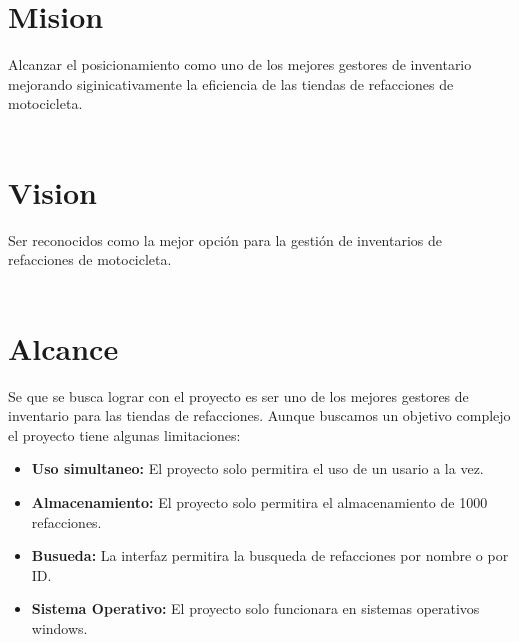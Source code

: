 \section*{Mision}

    Alcanzar el posicionamiento como uno de los mejores gestores de inventario
    mejorando siginicativamente la eficiencia de las tiendas de refacciones de motocicleta.
\\
\\
\section*{Vision}

    Ser reconocidos como la mejor opción para la gestión de inventarios de refacciones de motocicleta.
\\ \\
\section*{Alcance} Se que se busca lograr con el proyecto es 
ser uno de los mejores gestores de inventario para las tiendas de refacciones.
\newline
Aunque buscamos un objetivo complejo el proyecto tiene algunas limitaciones:

\begin{itemize}
    \item \textbf{Uso simultaneo:} El proyecto solo permitira el uso de un usario a la vez.
    \item \textbf{Almacenamiento:} El proyecto solo permitira el almacenamiento de 1000 refacciones.
    \item \textbf{Busueda:} La interfaz permitira la busqueda de refacciones por nombre o por ID.
    \item \textbf{Sistema Operativo:} El proyecto solo funcionara en sistemas operativos windows.
\end{itemize}